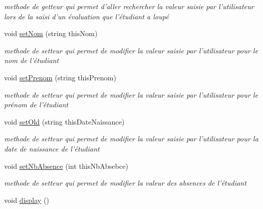 \begin{DoxyCompactItemize}
\begin{DoxyCompactList}\small\item\em methode de getteur qui permet d'aller rechercher la valeur saisie par l'utilisateur lors de la saisi d'un évaluation que l'étudiant a loupé \end{DoxyCompactList}\item 
\hypertarget{class_etudiant_a86e74508e1780e6521121ed1afbf3987}{void \hyperlink{class_etudiant_a86e74508e1780e6521121ed1afbf3987}{set\+Nom} (string this\+Nom)}\label{class_etudiant_a86e74508e1780e6521121ed1afbf3987}

\begin{DoxyCompactList}\small\item\em methode de setteur qui permet de modifier la valeur saisie par l'utilisateur pour le nom de l'étudiant \end{DoxyCompactList}\item 
\hypertarget{class_etudiant_a02fef0e3259e82cada9293331454eba9}{void \hyperlink{class_etudiant_a02fef0e3259e82cada9293331454eba9}{set\+Prenom} (string this\+Prenom)}\label{class_etudiant_a02fef0e3259e82cada9293331454eba9}

\begin{DoxyCompactList}\small\item\em methode de setteur qui permet de modifier la valeur saisie par l'utilisateur pour le prénom de l'étudiant \end{DoxyCompactList}\item 
\hypertarget{class_etudiant_a3cd8cbebc9426c70289953a474dfa5ee}{void \hyperlink{class_etudiant_a3cd8cbebc9426c70289953a474dfa5ee}{set\+Old} (string this\+Date\+Naissance)}\label{class_etudiant_a3cd8cbebc9426c70289953a474dfa5ee}

\begin{DoxyCompactList}\small\item\em methode de setteur qui permet de modifier la valeur saisie par l'utilisateur pour la date de naissance de l'étudiant \end{DoxyCompactList}\item 
\hypertarget{class_etudiant_a36f5dcdac557fa14dfa5a3808552cc53}{void \hyperlink{class_etudiant_a36f5dcdac557fa14dfa5a3808552cc53}{set\+Nb\+Absence} (int this\+Nb\+Absebce)}\label{class_etudiant_a36f5dcdac557fa14dfa5a3808552cc53}

\begin{DoxyCompactList}\small\item\em methode de setteur qui permet de modifier la valeur des absences de l'étudiant \end{DoxyCompactList}\item 
\hypertarget{class_etudiant_afb95ac0c74157e6065e1de603c54381c}{void \hyperlink{class_etudiant_afb95ac0c74157e6065e1de603c54381c}{display} ()}\label{class_etudiant_afb95ac0c74157e6065e1de603c54381c}


\end{DoxyCompactItemize}

